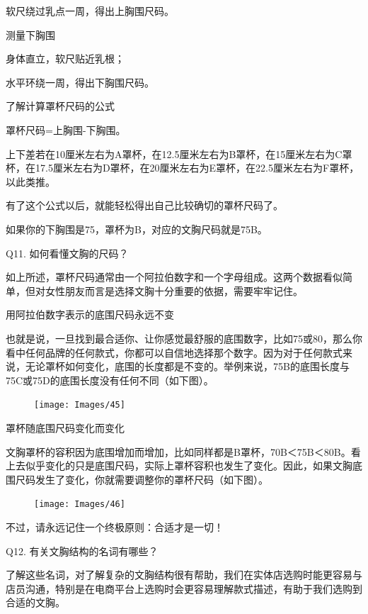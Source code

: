 \documentclass[12pt,UTF8]{ctexbook}
\begin{document}
软尺绕过乳点一周，得出上胸围尺码。


测量下胸围

身体直立，软尺贴近乳根；

水平环绕一周，得出下胸围尺码。

了解计算罩杯尺码的公式

罩杯尺码=上胸围-下胸围。

上下差若在10厘米左右为A罩杯，在12.5厘米左右为B罩杯，在15厘米左右为C罩杯，在17.5厘米左右为D罩杯，在20厘米左右为E罩杯，在22.5厘米左右为F罩杯，以此类推。

有了这个公式以后，就能轻松得出自己比较确切的罩杯尺码了。

如果你的下胸围是75，罩杯为B，对应的文胸尺码就是75B。





Q11. 如何看懂文胸的尺码？


如上所述，罩杯尺码通常由一个阿拉伯数字和一个字母组成。这两个数据看似简单，但对女性朋友而言是选择文胸十分重要的依据，需要牢牢记住。

用阿拉伯数字表示的底围尺码永远不变

也就是说，一旦找到最合适你、让你感觉最舒服的底围数字，比如75或80，那么你看中任何品牌的任何款式，你都可以自信地选择那个数字。因为对于任何款式来说，无论罩杯如何变化，底围的长度都是不变的。举例来说，75B的底围长度与75C或75D的底围长度没有任何不同（如下图）。

\begin{figure}[htbp]
	\centering
	\texttt{[image: Images/45]}
	\caption{}
	\label{fig:1}
\end{figure}

罩杯随底围尺码变化而变化

文胸罩杯的容积因为底围增加而增加，比如同样都是B罩杯，70B＜75B＜80B。看上去似乎变化的只是底围尺码，实际上罩杯容积也发生了变化。因此，如果文胸底围尺码发生了变化，你就需要调整你的罩杯尺码（如下图）。

\begin{figure}[htbp]
	\centering
	\texttt{[image: Images/46]}
	\caption{}
	\label{fig:1}
\end{figure}

不过，请永远记住一个终极原则：合适才是一切！





Q12. 有关文胸结构的名词有哪些？

了解这些名词，对了解复杂的文胸结构很有帮助，我们在实体店选购时能更容易与店员沟通，特别是在电商平台上选购时会更容易理解款式描述，有助于我们选购到合适的文胸。
\end{document}
